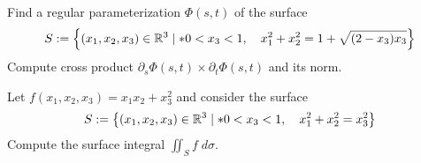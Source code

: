 \documentclass[11pt]{article}
\begin{document}
\begin{exercise}
    Find a regular parameterization $\Phi(s,t)$ of the surface 
    \begin{gather*}
        S := \left\{ (x_1,x_2,x_3) \in \mathbb R^3 \suchthat* 0 < x_3 < 1, \quad x_1^2 + x_2^2 = 1 + \sqrt{ ( 2 - x_3 ) x_3 } \right\}
    \end{gather*}
    Compute cross product $\partial_s \Phi(s,t) \times \partial_t \Phi(s,t)$ and its norm. 
\end{exercise}
\begin{solution}     

\end{solution}

\begin{exercise}
    Let $f(x_1,x_2,x_3) = x_1 x_2 + x_3^2$ and consider the surface 
    \begin{gather*}
        S := \left\{ (x_1,x_2,x_3) \in \mathbb R^3 \suchthat* 0 < x_3 < 1, \quad x_1^2 + x_2^2 = x_3^2 \right\}
    \end{gather*}
    Compute the surface integral $\iint_S f \;d\sigma$. 
\end{exercise}
\end{document}
